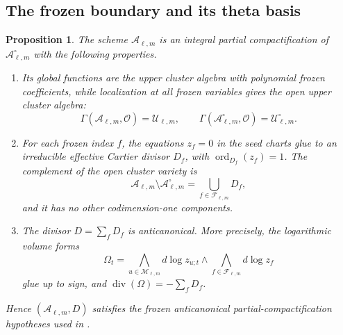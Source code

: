 \documentclass[11pt]{amsart}
\newtheorem{proposition}[theorem]{Proposition}
\theoremstyle{definition}
\theoremstyle{remark}
\newcommand{\cU}{\mathcal U}
\begin{document}
\subsection{The frozen boundary and its theta basis}

\begin{proposition}\label{prop:frozen-partial-compactification}
The scheme $\mathcal A_{\ell,m}$ is an integral partial compactification of
$\mathcal A_{\ell,m}^{\circ}$ with the following properties.
\begin{enumerate}
 \item Its global functions are the upper cluster algebra with polynomial
       frozen coefficients, while localization at all frozen variables
       gives the open upper cluster algebra:
       \begin{equation}
       \Gamma(\mathcal A_{\ell,m},\mathcal O)=\cU_{\ell,m},
       \qquad
       \Gamma(\mathcal A_{\ell,m}^{\circ},\mathcal O)
       =\cU_{\ell,m}^{\circ}.
       \label{eq:cluster-global-sections}
       \end{equation}
 \item For each frozen index $f$, the equations $z_f=0$ in the seed charts
       glue to an irreducible effective Cartier divisor $D_f$, with
       $\operatorname{ord}_{D_f}(z_f)=1$.  The complement of the open
       cluster variety is
       \begin{equation}
       \mathcal A_{\ell,m}\setminus\mathcal A_{\ell,m}^{\circ}
       =\bigcup_{f\in\mathscr F_{\ell,m}}D_f,
       \label{eq:frozen-boundary-union}
       \end{equation}
       and it has no other codimension-one components.
 \item The divisor $D=\sum_fD_f$ is anticanonical.  More precisely, the
       logarithmic volume forms
       \begin{equation}
       \Omega_t
       =\bigwedge_{u\in\mathscr M_{\ell,m}}d\log z_{u;t}
        \wedge
        \bigwedge_{f\in\mathscr F_{\ell,m}}d\log z_f
       \label{eq:cluster-volume-form}
       \end{equation}
       glue up to sign, and
       $\operatorname{div}(\Omega)=-\sum_fD_f$.
\end{enumerate}
Hence $(\mathcal A_{\ell,m},D)$ satisfies the frozen anticanonical
partial-compactification hypotheses used in
\cite[Corollary~1.2]{CMMM}.
\end{proposition}
\end{document}
